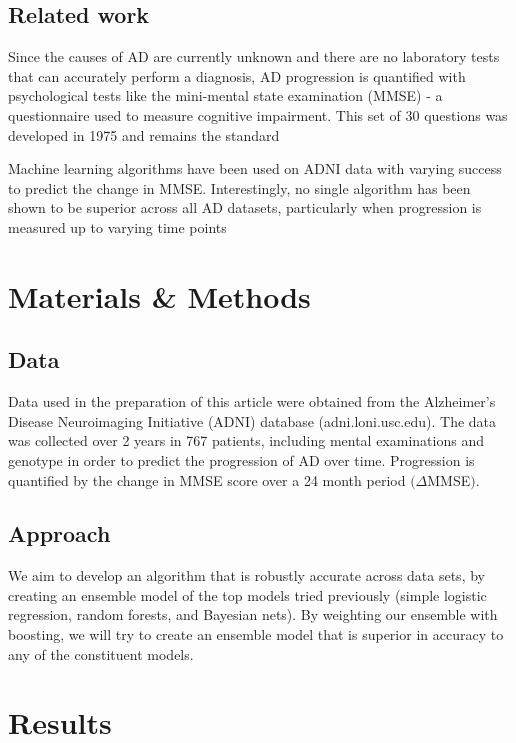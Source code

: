 \documentclass{article}
\begin{document}
\subsection{Related work} Since the causes of AD are currently unknown and there are no laboratory tests that can accurately perform a diagnosis, AD progression is quantified with psychological tests like the mini-mental state examination (MMSE) - a questionnaire used to measure cognitive impairment. This set of 30 questions was developed in 1975 and remains the standard \cite{carolan07}

Machine learning algorithms have been used on ADNI data with varying success to predict the change in MMSE. Interestingly, no single algorithm has been shown to be superior across all AD datasets, particularly when progression is measured up to varying time points \cite{umer11}

\section{Materials \& Methods}
\subsection{Data} Data used in the preparation of this article were obtained from the Alzheimer's Disease Neuroimaging Initiative (ADNI) database (adni.loni.usc.edu). The data was collected over 2 years in 767 patients, including mental examinations and genotype in order to predict the progression of AD over time. Progression is quantified by the change in MMSE score over a 24 month period $(\Delta$MMSE$)$.

\subsection{Approach} We aim to develop an algorithm that is robustly accurate across data sets, by creating an ensemble model of the top models tried previously (simple logistic regression, random forests, and Bayesian nets). By weighting our ensemble with boosting, we will try to create an ensemble model that is superior in accuracy to any of the constituent models.

\section{Results}
\end{document}
